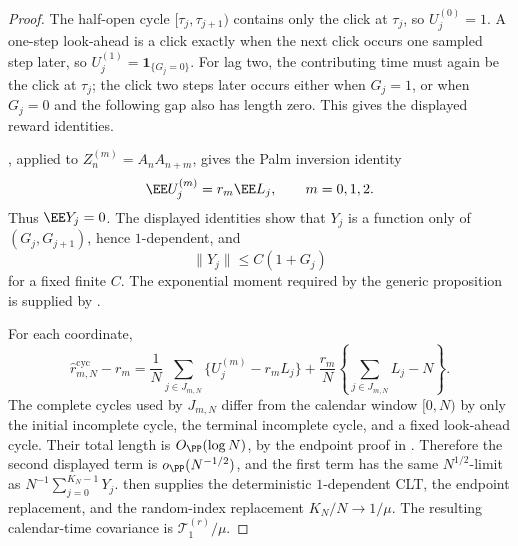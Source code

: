 \begin{proof}
The half-open cycle \([\tau_j,\tau_{j+1})\) contains only the click at
\(\tau_j\), so \(U_j^{(0)}=1\).  A one-step look-ahead is a click exactly
when the next click occurs one sampled step later, so
\(U_j^{(1)}=\mathbf1_{\{G_j=0\}}\).  For lag two, the contributing time must
again be the click at \(\tau_j\); the click two steps later occurs either
when \(G_j=1\), or when \(G_j=0\) and the following gap also has length zero.
This gives the displayed reward identities.

, applied to
\(Z_n^{(m)}=A_nA_{n+m}\), gives the Palm inversion identity
\[
\EE U_j^{(m)}=r_m\EE L_j,\qquad m=0,1,2.
\]
Thus \(\EE Y_j=0\).  The displayed identities show that \(Y_j\) is a
function only of \((G_j,G_{j+1})\), hence \(1\)-dependent, and
\[
\|Y_j\|\le C(1+G_j)
\]
for a fixed finite \(C\).  The exponential moment required by the generic
proposition is supplied by
.

For each coordinate,
\[
\widehat r_{m,N}^{\mathrm{cyc}}-r_m
=\frac1N\sum_{j\in J_{m,N}}\{U_j^{(m)}-r_mL_j\}
+\frac{r_m}{N}\left\{\sum_{j\in J_{m,N}}L_j-N\right\}.
\]
The complete cycles used by \(J_{m,N}\) differ from the calendar window
\([0,N)\) by only the initial incomplete cycle, the terminal incomplete
cycle, and a fixed look-ahead cycle.  Their total length is
\(O_{\PP}(\log N)\), by the endpoint proof in
.  Therefore the
second displayed term is \(o_{\PP}(N^{-1/2})\), and the first term has the
same \(N^{1/2}\)-limit as \(N^{-1}\sum_{j=0}^{K_N-1}Y_j\).
 then supplies the
deterministic \(1\)-dependent CLT, the endpoint replacement, and the
random-index replacement \(K_N/N\to1/\mu\).  The resulting calendar-time
covariance is \(\mathcal T_1^{(r)}/\mu\).
\end{proof}


